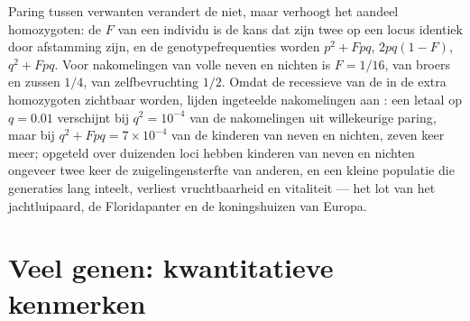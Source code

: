 \begin{proposition}[Inteelt]\label{prop:b2:population-genetics:inbreeding}
Paring tussen verwanten verandert de  niet, maar verhoogt het
aandeel homozygoten: de \emph{} $F$ van een individu is de
kans dat zijn twee  op een locus identiek door afstamming zijn, en de
genotypefrequenties worden $p^{2} + Fpq$, $2pq(1 - F)$, $q^{2} + Fpq$. Voor
nakomelingen van volle neven en nichten is $F = 1/16$, van broers en zussen $1/4$, van
zelfbevruchting $1/2$. Omdat de recessieve  van de  in
de extra homozygoten zichtbaar worden, lijden ingeteelde nakomelingen aan
\emph{}: een letaal   op $q = 0.01$
verschijnt bij $q^{2} = 10^{-4}$ van de nakomelingen uit willekeurige paring,
maar bij
$q^{2} + Fpq = 7\times 10^{-4}$ van de kinderen van neven en nichten, zeven keer meer;
opgeteld over duizenden loci hebben kinderen van neven en nichten ongeveer
twee keer de zuigelingensterfte van anderen, en een kleine populatie die
generaties lang inteelt, verliest vruchtbaarheid en vitaliteit --- het lot
van het jachtluipaard, de Floridapanter en de koningshuizen van Europa.
\end{proposition}

\section{Veel genen: kwantitatieve kenmerken}

